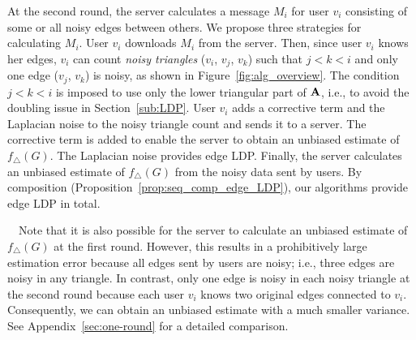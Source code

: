 At the second round, the server calculates a message $M_i$ for user $v_i$ consisting of some or all noisy edges between others. 
We propose three strategies for calculating $M_i$. 
User $v_i$ downloads $M_i$ from the server.
Then, since user $v_i$ knows her edges, $v_i$ can count \textit{noisy triangles} ($v_i$, $v_j$, $v_k$) such that $j<k<i$ and only one edge ($v_j$, $v_k$) is noisy, as shown in Figure~\ref{fig:alg_overview}. 
The condition $j<k<i$ is imposed to use only the lower triangular part of $\mathbf{A}$, i.e., 
to avoid the doubling issue in Section~\ref{sub:LDP}. 
User $v_i$ adds %
a corrective term
and the Laplacian noise
to the noisy triangle count 
and sends it to a server.
The corrective term is added to enable the server to obtain an unbiased estimate of $f_\triangle(G)$. 
The Laplacian noise provides
edge LDP.
Finally,
the server calculates an unbiased estimate of $f_\triangle(G)$
from the noisy data sent by users.
By composition (Proposition~\ref{prop:seq_comp_edge_LDP}),
our algorithms provide
edge LDP in total.

\smallskip
{}~~Note that it is also possible for the server to calculate an unbiased estimate of $f_\triangle(G)$ at the first round.
However, this results in a
prohibitively
large estimation error
because
all edges sent by users are noisy; i.e., three edges are noisy in any triangle.
In contrast, only one edge is noisy in each noisy triangle at the second round because each user $v_i$ knows two original edges
connected to $v_i$.
Consequently, we can obtain an unbiased estimate with a much smaller variance.
See Appendix~\ref{sec:one-round} for a detailed comparison.

